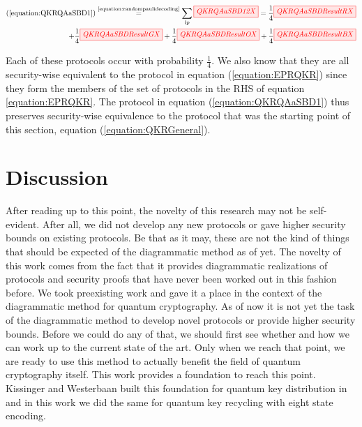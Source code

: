 \documentclass[]{article}
\newcommand{\equaltext}[1]{\ensuremath{\stackrel{\text{#1}}{=}}}
\begin{document}
\begin{equation}
	\label{equation:QKRQAaSBDResult}
	\begin{aligned}
	(\ref{equation:QKRQAaSBD1}) \equaltext{\ref{equation:randompaulidecoding}}
	\sum\limits_{lp}\tikzfig{QKRQAaSBD12X} 
	=
	 \frac{1}{4}\tikzfig{QKRQAaSBDResultRX} \\+
	\frac{1}{4}\tikzfig{QKRQAaSBDResultGX} +
	\frac{1}{4}\tikzfig{QKRQAaSBDResultOX} +
	\frac{1}{4}\tikzfig{QKRQAaSBDResultBX}
	\end{aligned}
\end{equation}

Each of these protocols occur with probability $\frac{1}{4}$. We also know that they are all security-wise equivalent to the protocol in equation (\ref{equation:EPRQKR}) since they form the members of the set of protocols in the RHS of equation \ref{equation:EPRQKR}. The protocol in equation (\ref{equation:QKRQAaSBD1}) thus preserves security-wise equivalence to the protocol that was the starting point of this section, equation (\ref{equation:QKRGeneral}).

\section{Discussion}





After reading up to this point, the novelty of this research may not be self-evident. After all, we did not develop any new protocols or gave higher security bounds on existing protocols. Be that as it may, these are not the kind of things that should be expected of the diagrammatic method as of yet. The novelty of this work comes from the fact that it provides diagrammatic realizations of protocols and security proofs that have never been worked out in this fashion before. We took preexisting work and gave it a place in the context of the diagrammatic method for quantum cryptography. As of now it is not yet the task of the diagrammatic method to develop novel protocols or provide higher security bounds. Before we could do any of that, we should first see whether and how we can work up to the current state of the art. Only when we reach that point, we are ready to use this method to actually benefit the field of quantum cryptography itself. This work provides a foundation to reach this point. Kissinger and Westerbaan built this foundation for quantum key distribution in \cite{Kissinger2017} and in this work we did the same for quantum key recycling with eight state encoding.
\end{document}
